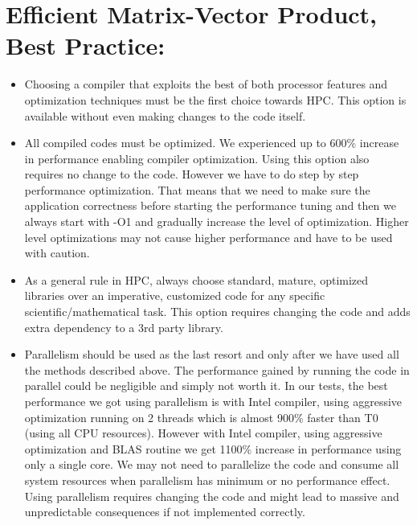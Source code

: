 \documentclass[a4paper,11pt]{article}
\begin{document}
\section{\large Efficient Matrix-Vector Product, Best Practice:}
\begin{itemize}
    \setlength\itemsep{0em}
    \item Choosing a compiler that exploits the best of both processor features and optimization techniques must be the first choice towards HPC. This option is available without even making changes to the code itself.
    \item All compiled codes must be optimized. We experienced up to 600\% increase in performance enabling compiler optimization. Using this option also requires no change to the code. However we have to do step by step performance optimization. That means that we need to make sure the application correctness before starting the performance tuning and then we always start with -O1 and gradually increase the level of optimization. Higher level optimizations may not cause higher performance and have to be used with caution.
    \item As a general rule in HPC, always choose standard, mature, optimized libraries over an imperative, customized code for any specific scientific/mathematical task. This option requires changing the code and adds extra dependency to a 3rd party library.
    \item Parallelism should be used as the last resort and only after we have used all the methods described above. The performance gained by running the code in parallel could be negligible and simply not worth it. In our tests, the best performance we got using parallelism is with Intel compiler, using aggressive optimization running on 2 threads which is almost 900\% faster than T0 (using all CPU resources). However with Intel compiler, using aggressive optimization and BLAS routine we get 1100\% increase in performance using only a single core. We may not need to parallelize the code and consume all system resources when parallelism has minimum or no performance effect. Using parallelism requires changing the code and might lead to massive and unpredictable consequences if not implemented correctly.
\end{itemize}


\newpage
\end{document}
